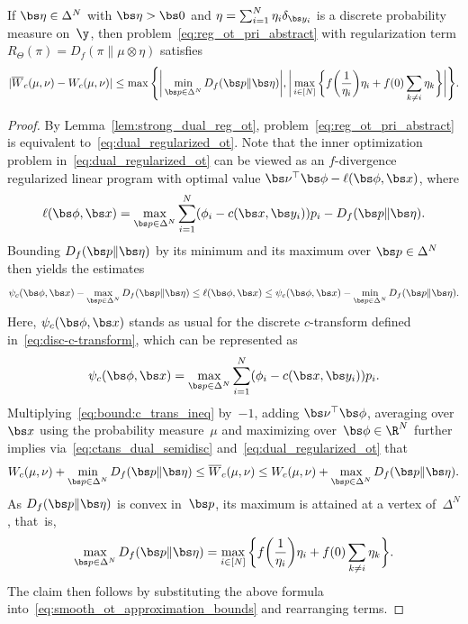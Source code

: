 \documentclass[11pt, a4paper, oneside, reqno]{article}
\begin{document}
	
	\begin{proposition}
		\label{prop:approx_bound}
		If $\bs\eta\in\Delta^N$ with $\bs\eta>\bs 0$ and $\eta = \sum_{i=1}^N \eta_i \delta_{\bs y_i}$ is a discrete probability measure on~$\y$, then problem~\eqref{eq:reg_ot_pri_abstract} with regularization term $R_\Theta (\pi ) =  D_{f}(\pi\|\mu \otimes \eta)$ satisfies
		\[|\overline W_c(\mu, \nu) - W_c(\mu, \nu)| \leq  \max\Bigg\{\bigg|\min_{\bs p \in \Delta^N} D_f(\bs p \| \bs \eta )\bigg|, \bigg|\max_{i \in [N]}\bigg\{ f\bigg(\frac{1}{\eta_i}\bigg) \eta_i+ f(0) \sum_{k \neq i} \eta_k\bigg\}\bigg|\Bigg\}.\]
	\end{proposition}
	\begin{proof}
		By Lemma~\ref{lem:strong_dual_reg_ot}, problem~\eqref{eq:reg_ot_pri_abstract} is equivalent to~\eqref{eq:dual_regularized_ot}. Note that the inner optimization problem in~\eqref{eq:dual_regularized_ot} can be viewed as an $f$-divergence regularized linear program with optimal value $\bs \nu^\top \bs\phi-\ell(\bs \phi, \bs x)$, where
		\[
		\ell(\bs \phi, \bs x) = \max\limits_{\bs p \in \Delta^N} \sum\limits_{i=1}^N (\phi_i - c(\bs x, \bs y_i)) p_i -  D_f(\bs p \| \bs \eta).
		\] 
		Bounding $D_f(\bs p \| \bs \eta)$ by its minimum and its maximum over $\bs p\in\Delta^N$ then yields the estimates
		\begin{equation}
		\label{eq:bound:c_trans_ineq}
		\psi_c(\bs \phi, \bs x) - \max_{ \bs p \in \Delta^N} D_f(\bs p \| \bs \eta)  \leq \ell(\bs \phi, \bs x) \leq \psi_c(\bs \phi, \bs x) - \min_{\bs p \in \Delta^N} D_f(\bs p \| \bs \eta).
		\end{equation}
		Here, $\psi_c(\bs \phi, \bs x)$ stands as usual for the discrete $c$-transform defined in~\eqref{eq:disc-c-transform}, which can be represented as
		\begin{equation}
		\label{eq:bound:ot_ineq}
		\psi_c(\bs \phi, \bs x) = \max\limits_{\bs p \in \Delta^N}\sum\limits_{i=1}^N (\phi_i - c(\bs x, \bs y_i)) p_i.
		\end{equation}
		Multiplying~\eqref{eq:bound:c_trans_ineq} by~$-1$, adding $\bs\nu^\top\bs \phi$, averaging over~$\bs x$ using the probability measure~$\mu$ and maximizing over~$\bs \phi \in \R^N$ further implies via~\eqref{eq:ctans_dual_semidisc} and~\eqref{eq:dual_regularized_ot} that
		\begin{equation}
		\label{eq:smooth_ot_approximation_bounds}
		W_c(\mu,\nu)+ \min_{ \bs p \in \Delta^N} D_f(\bs p \| \bs \eta)  \leq \overline W_c(\mu, \nu) \leq W_c(\mu,\nu) + \max_{\bs p \in \Delta^N} D_f(\bs p \| \bs \eta).
		\end{equation}
		As $D_f(\bs p \| \bs \eta)$ is convex in~$\bs p$, its maximum is attained at a vertex of~$\Delta^N$ \citep[Theorem~1]{hoffman1981method}, that~is,
		\[
		\max_{\bs p \in \Delta^N} D_f(\bs p \| \bs \eta) = \max_{i \in [N]}\bigg\{ f\bigg(\frac{1}{\eta_i}\bigg) \eta_i + f(0) \sum_{k \neq i} \eta_k\bigg\}.
		\]
		The claim then follows by substituting the above formula into~\eqref{eq:smooth_ot_approximation_bounds} and rearranging terms.
	\end{proof}
\end{document}

